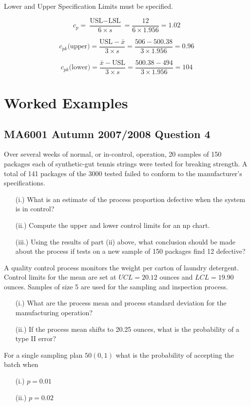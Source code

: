 \documentclass[MASTER-SPC.tex]{subfiles}
\begin{document}
Lower and Upper Specification Limits must be specified.

\[  c_p = \frac{\mbox{USL} - \mbox{LSL} }{6 \times s} = \frac{12}{6 \times 1.956} = 1.02 \]

\[  c_{pk}\mbox{(upper)} = \frac{\mbox{USL} - \bar{x} }{3 \times s} = \frac{506-500.38}{3 \times 1.956} = 0.96\]

\[  c_{pk}\mbox{(lower)} =\frac{ \bar{x} -\mbox{USL}} {3 \times s} = \frac{500.38-494}{3 \times 1.956} = 104\]
\section{Worked Examples}
\subsection{MA6001 Autumn 2007/2008 Question 4}
Over several weeks of normal, or in-control, operation, 20 samples of 150 packages each of synthetic-gut tennis strings were tested for breaking strength. A total of 141 packages of the 3000 tested failed to conform to the manufacturer's specifications.		

\begin{itemize}
	\item[(i.)]	What is an estimate of the process proportion defective when the system is in control?		
	\item[(ii.)] Compute the upper and lower control limits for an np chart.	
	\item[(iii.)] Using the results of part (ii) above, what conclusion should be made about the process if tests on a new sample of 150 packages find 12 defective?
\end{itemize}

A quality control process monitors the weight per carton of laundry detergent. Control limits for the mean are set at $UCL = 20.12$ ounces and $LCL = 19.90$ ounces. Samples of size 5 are used for the sampling and inspection process.

\begin{itemize}
	\item[(i.)] What are the process mean and process standard deviation for the manufacturing operation?		
	\item[(ii.)] If the process mean shifts to 20.25 ounces, what is the probability of a type II error?		
\end{itemize}

For a single sampling plan $50(0,1)$ what is the probability of accepting the batch when
\begin{itemize}
	\item[(i.)] $p = 0.01$
	\item[(ii.)] $p = 0.02$		
\end{itemize}
\end{document}
